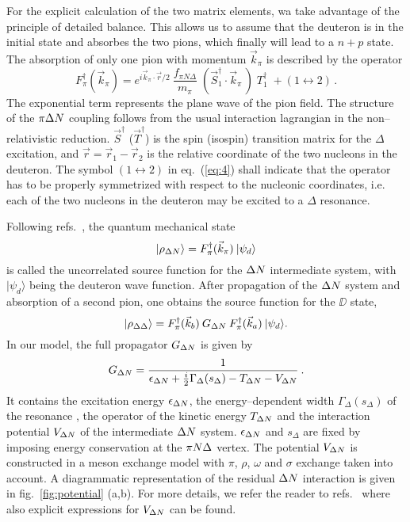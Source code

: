 For the explicit calculation of the two matrix elements, wa take advantage of 
the principle of detailed balance. This allows us to assume that the deuteron 
is in the initial state and absorbes the two pions, which finally will lead
to a $n+p$ state. The absorption of only one pion with momentum 
$\vec k_\pi$ is described by the operator
%
\begin{equation}
  \label{eq:4}
  F^{\dagger}_\pi (\vec k_\pi) =  
  e^{i \vec k_\pi \cdot \vec r /2} \: \frac{f_{\pi N \Delta}}{m_\pi}
  \; ( \vec S_1^\dagger \cdot \vec k_\pi \,) \; T_1^\dagger \; + (1 \leftrightarrow 2) \, .
\end{equation}
%
The exponential term represents the plane wave of the pion field. The 
structure of the $\pi {\Delta N}$ coupling follows from the usual interaction
lagrangian \cite{machleidt87} in the non--relativistic reduction.
$\vec S^\dagger$ ($\vec T^\dagger$) is the spin (isospin) transition matrix 
\cite{weber78} for the $\Delta$ excitation, and $\vec r = \vec r_1 - \vec r_2$ 
is the relative coordinate of the two nucleons in the deuteron. 
The symbol $(1 \leftrightarrow 2)$ in eq.\ (\ref{eq:4}) shall indicate
that the operator has to be properly symmetrized with respect to the
nucleonic coordinates, i.e. each of the two nucleons 
in the deuteron may be excited to a $\Delta$ resonance. 

Following refs.\ \cite{udagawa94,mosbacher97}, the quantum mechanical state
%
\begin{equation}
  \label{eq:5}
  | \rho_{\Delta N} \rangle = F^{\dagger}_\pi (\vec k_\pi) \: | \psi_d \rangle 
\end{equation}
%
is called the uncorrelated source function for the ${\Delta N}$ intermediate system,
with $| \psi_d \rangle$ being the deuteron wave function.
After propagation of the ${\Delta N}$ system and absorption of a second pion, one 
obtains the source function for the $\DD$ state,
%
\begin{equation} 
  \label{eq:6}
  | \rho_{\Delta \Delta} \rangle = 
  F^{\dagger}_\pi (\vec k_b) \: G_{\Delta N} \: 
  F^{\dagger}_\pi (\vec k_a) \: | \psi_d \rangle .
\end{equation}
%
In our model, the full propagator $G_{\Delta N}$ is given by 
%
\begin{equation}
  \label{eq:7}
  G_{\Delta N} = \frac{1}{ \epsilon_{\Delta N} + \frac{i}{2} \Gamma_\Delta (s_\Delta)
  - T_{\Delta N} - V_{\Delta N} } \:.
\end{equation}
%
It contains the excitation energy $\epsilon_{\Delta N}$,
the energy--dependent width $\Gamma_\Delta (s_\Delta)$ of the resonance
\cite{dmitriev86}, the operator of the kinetic energy $T_{\Delta N}$ and the 
interaction potential $V_{\Delta N}$ of the intermediate ${\Delta N}$ system. 
$\epsilon_{\Delta N}$ and $s_\Delta$ are fixed by imposing energy conservation 
at the $\pi {N \Delta}$ vertex.
The potential $V_{\Delta N}$ is constructed in a meson exchange model with
$\pi$, $\rho$, $\omega$ and $\sigma$ exchange taken into account.
A diagrammatic representation of the residual ${\Delta N}$ interaction is given in
fig.\ \ref{fig:potential} (a,b). 
For more details, we refer the reader to refs.\ \cite{mosbacher97,mosbacher98c}
where also explicit expressions for $V_{{\Delta N}}$ can be found. 


